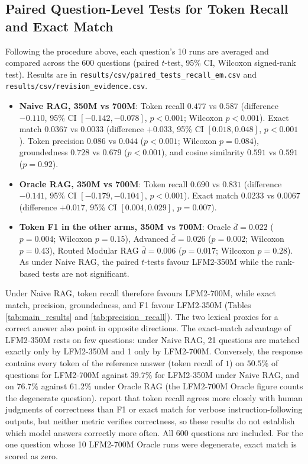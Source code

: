 \documentclass[10pt]{article}
\begin{document}
\subsection{Paired Question-Level Tests for Token Recall and Exact Match}
\label{sec:paired_recall_em}
Following the procedure above, each question's 10 runs are averaged and compared across the 600 questions (paired $t$-test, 95\% CI, Wilcoxon signed-rank test). Results are in \texttt{results/csv/paired\_tests\_recall\_em.csv} and \texttt{results/csv/revision\_evidence.csv}.
\begin{itemize}
    \item \textbf{Naive RAG, 350M vs 700M}: Token recall $0.477$ vs $0.587$ (difference $-0.110$, 95\% CI $[-0.142, -0.078]$, $p<0.001$; Wilcoxon $p<0.001$). Exact match $0.0367$ vs $0.0033$ (difference $+0.033$, 95\% CI $[0.018, 0.048]$, $p<0.001$). Token precision $0.086$ vs $0.044$ ($p<0.001$; Wilcoxon $p=0.084$), groundedness $0.728$ vs $0.679$ ($p<0.001$), and cosine similarity $0.591$ vs $0.591$ ($p=0.92$).
    \item \textbf{Oracle RAG, 350M vs 700M}: Token recall $0.690$ vs $0.831$ (difference $-0.141$, 95\% CI $[-0.179, -0.104]$, $p<0.001$). Exact match $0.0233$ vs $0.0067$ (difference $+0.017$, 95\% CI $[0.004, 0.029]$, $p=0.007$).
    \item \textbf{Token F1 in the other arms, 350M vs 700M}: Oracle $\bar{d}=0.022$ ($p=0.004$; Wilcoxon $p=0.15$), Advanced $\bar{d}=0.026$ ($p=0.002$; Wilcoxon $p=0.43$), Routed Modular RAG $\bar{d}=0.006$ ($p=0.017$; Wilcoxon $p=0.28$). As under Naive RAG, the paired $t$-tests favour LFM2-350M while the rank-based tests are not significant.
\end{itemize}
Under Naive RAG, token recall therefore favours LFM2-700M, while exact match, precision, groundedness, and F1 favour LFM2-350M (Tables \ref{tab:main_results} and \ref{tab:precision_recall}). The two lexical proxies for a correct answer also point in opposite directions. The exact-match advantage of LFM2-350M rests on few questions: under Naive RAG, 21 questions are matched exactly only by LFM2-350M and 1 only by LFM2-700M. Conversely, the response contains every token of the reference answer (token recall of $1$) on $50.5\%$ of questions for LFM2-700M against $39.7\%$ for LFM2-350M under Naive RAG, and on $76.7\%$ against $61.2\%$ under Oracle RAG (the LFM2-700M Oracle figure counts the degenerate question). \citet{adlakha2024evaluating} report that token recall agrees more closely with human judgments of correctness than F1 or exact match for verbose instruction-following outputs, but neither metric verifies correctness, so these results do not establish which model answers correctly more often. All 600 questions are included. For the one question whose 10 LFM2-700M Oracle runs were degenerate, exact match is scored as zero.
\end{document}
